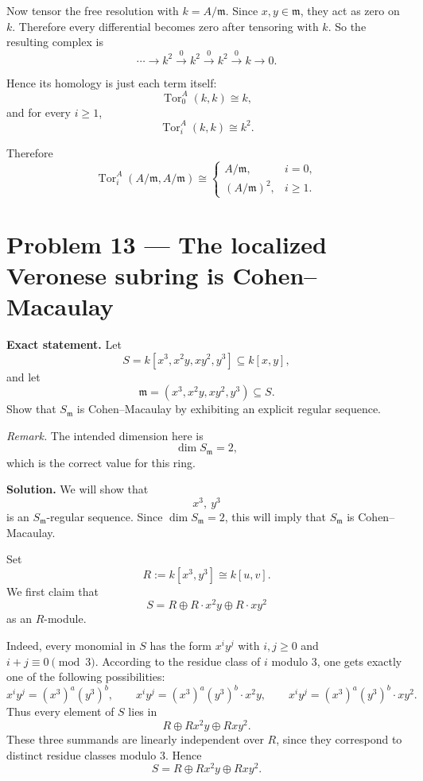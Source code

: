 \documentclass[12pt,a4paper]{article}
\theoremstyle{plain}
\theoremstyle{definition}      %
\begin{document}
Now tensor the free resolution with \(k=A/\mathfrak m\). Since \(x,y\in \mathfrak m\), they act as zero on \(k\). Therefore every differential becomes zero after tensoring with \(k\). So the resulting complex is
\[
\cdots \to k^2 \xrightarrow{0} k^2 \xrightarrow{0} k^2 \xrightarrow{0} k \to 0.
\]

Hence its homology is just each term itself:
\[
\operatorname{Tor}_0^A(k,k)\cong k,
\]
and for every \(i\ge 1\),
\[
\operatorname{Tor}_i^A(k,k)\cong k^2.
\]

Therefore
\[
\operatorname{Tor}_i^A(A/\mathfrak m,A/\mathfrak m)\cong
\begin{cases}
	A/\mathfrak m,& i=0,\\[1mm]
	(A/\mathfrak m)^2,& i\ge 1.
\end{cases}
\]

\section*{Problem 13 --- The localized Veronese subring is Cohen--Macaulay}

\textbf{Exact statement.}
Let
\[
S=k[x^3,x^2y,xy^2,y^3]\subseteq k[x,y],
\]
and let
\[
\mathfrak m=(x^3,x^2y,xy^2,y^3)\subseteq S.
\]
Show that \(S_{\mathfrak m}\) is Cohen--Macaulay by exhibiting an explicit regular sequence.

\medskip

\textit{Remark.} The intended dimension here is
\[
\dim S_{\mathfrak m}=2,
\]
which is the correct value for this ring.

\textbf{Solution.}
We will show that
\[
x^3,\ y^3
\]
is an \(S_{\mathfrak m}\)-regular sequence. Since \(\dim S_{\mathfrak m}=2\), this will imply that \(S_{\mathfrak m}\) is Cohen--Macaulay.

\medskip

Set
\[
R:=k[x^3,y^3]\cong k[u,v].
\]
We first claim that
\[
S=R\oplus R\cdot x^2y \oplus R\cdot xy^2
\]
as an \(R\)-module.

Indeed, every monomial in \(S\) has the form \(x^i y^j\) with \(i,j\ge 0\) and \(i+j\equiv 0\pmod 3\). According to the residue class of \(i\) modulo \(3\), one gets exactly one of the following possibilities:
\[
x^i y^j=(x^3)^a(y^3)^b,
\qquad
x^i y^j=(x^3)^a(y^3)^b\cdot x^2y,
\qquad
x^i y^j=(x^3)^a(y^3)^b\cdot xy^2.
\]
Thus every element of \(S\) lies in
\[
R\oplus R x^2y \oplus R xy^2.
\]
These three summands are linearly independent over \(R\), since they correspond to distinct residue classes modulo \(3\). Hence
\[
S=R\oplus R x^2y \oplus R xy^2.
\]
\end{document}
